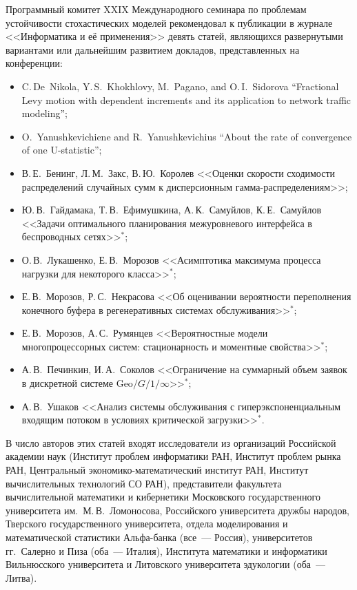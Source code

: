 {{{     Программный комитет XXIX Международного семинара по проблемам 
устойчивости стохастических моделей рекомендовал к публикации в журнале 
<<Информатика и её применения>> девять статей, являющихся развернутыми вариантами 
или дальнейшим развитием докладов, представленных на конференции:
     \begin{itemize}
\item C.\,De~Nikola, Y.\,S.~Khokhlovy, M.~Pagano, and O.\,I.~Sidorova ``Fractional 
Levy motion with dependent increments and its application to network traffic modeling'';
\item O.~Yanushkevichiene and R.~Yanushkevichius ``About the rate of convergence of one 
U-statistic'';
\item В.\,Е.~Бенинг, Л.\,М.~Закс, В.\,Ю.~Королев <<Оценки скорости сходимости 
распределений случайных сумм к дисперсионным гамма-распределениям>>;
\item Ю.\,В.~Гайдамака, Т.\,В.~Ефимушкина, А.\,К.~Самуйлов, К.\,Е.~Самуйлов 
<<Задачи оптимального планирования межуровневого интерфейса в беспроводных 
сетях>>$^*$;
\item О.\,В.~Лукашенко, Е.\,В.~Морозов <<Асимптотика максимума процесса 
нагрузки для некоторого класса>>$^*$;
\item Е.\,В.~Морозов, Р.\,С.~Некрасова <<Об оценивании вероятности 
переполнения конечного буфера в регенеративных системах обслуживания>>$^*$;
\item Е.\,В.~Морозов, А.\,С.~Румянцев <<Вероятностные модели 
многопроцессорных систем: стационарность и моментные свойства>>$^*$;
\item А.\,В.~Печинкин, И.\,А.~Соколов <<Ограничение на суммарный объем заявок 
в дискретной системе Geo$/G/1/\infty$>>$^*$;
\item А.\,В.~Ушаков <<Анализ системы обслуживания с гиперэкспоненциальным 
входящим потоком в условиях критической загрузки>>$^*$.
\end{itemize}

     В число авторов этих статей входят исследователи из организаций Российской 
академии наук (Институт проблем информатики РАН, Институт проблем рынка РАН, 
Центральный экономико-математический институт РАН, Институт вычислительных 
технологий СО РАН), представители факультета вычислительной математики и 
кибернетики Московского государственного университета им.\ М.\,В.~Ломоносова, 
Российского университета дружбы народов, Тверского государственного университета, 
отдела моделирования и математической статистики Альфа-банка (все~--- Россия), 
университетов гг.~Салерно и Пиза (оба~--- Италия), Института математики и 
информатики Вильнюсского университета и Литовского университета эдукологии (оба~--- 
Литва).
     
}}}
